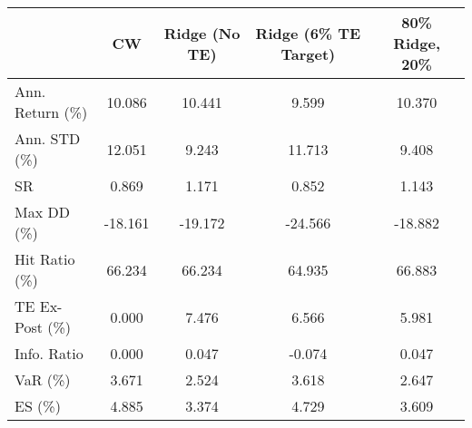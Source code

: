 \begin{tabular}{lcccc}
\toprule
{} &      CW &  Ridge (No TE) &  Ridge (6\% TE Target) &  80\% Ridge, 20\% \\
\midrule
Ann. Return (\%) &  10.086 &         10.441 &                 9.599 &          10.370 \\
Ann. STD (\%)    &  12.051 &          9.243 &                11.713 &           9.408 \\
SR              &   0.869 &          1.171 &                 0.852 &           1.143 \\
Max DD (\%)      & -18.161 &        -19.172 &               -24.566 &         -18.882 \\
Hit Ratio (\%)   &  66.234 &         66.234 &                64.935 &          66.883 \\
TE Ex-Post (\%)  &   0.000 &          7.476 &                 6.566 &           5.981 \\
Info. Ratio     &   0.000 &          0.047 &                -0.074 &           0.047 \\
VaR (\%)         &   3.671 &          2.524 &                 3.618 &           2.647 \\
ES (\%)          &   4.885 &          3.374 &                 4.729 &           3.609 \\
\bottomrule
\end{tabular}
